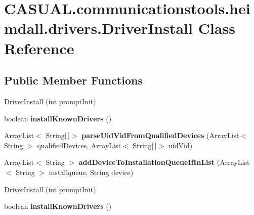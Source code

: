 \hypertarget{class_c_a_s_u_a_l_1_1communicationstools_1_1heimdall_1_1drivers_1_1_driver_install}{\section{C\-A\-S\-U\-A\-L.\-communicationstools.\-heimdall.\-drivers.\-Driver\-Install Class Reference}
\label{class_c_a_s_u_a_l_1_1communicationstools_1_1heimdall_1_1drivers_1_1_driver_install}
}
\subsection*{Public Member Functions}
\begin{DoxyCompactItemize}
\item 
\hyperlink{class_c_a_s_u_a_l_1_1communicationstools_1_1heimdall_1_1drivers_1_1_driver_install_a3973890d1a2927f6df5cc86afa09434a}{Driver\-Install} (int prompt\-Init)
\item 
\hypertarget{class_c_a_s_u_a_l_1_1communicationstools_1_1heimdall_1_1drivers_1_1_driver_install_a244d7701888d5a8b2a308f7d942bacaf}{boolean {\bfseries install\-Known\-Drivers} ()}\label{class_c_a_s_u_a_l_1_1communicationstools_1_1heimdall_1_1drivers_1_1_driver_install_a244d7701888d5a8b2a308f7d942bacaf}

\item 
\hypertarget{class_c_a_s_u_a_l_1_1communicationstools_1_1heimdall_1_1drivers_1_1_driver_install_a18f48b07185e6c00735b8475f2915804}{Array\-List$<$ String\mbox{[}$\,$\mbox{]}$>$ {\bfseries parse\-Uid\-Vid\-From\-Qualified\-Devices} (Array\-List$<$ String $>$ qualified\-Devices, Array\-List$<$ String\mbox{[}$\,$\mbox{]}$>$ uid\-Vid)}\label{class_c_a_s_u_a_l_1_1communicationstools_1_1heimdall_1_1drivers_1_1_driver_install_a18f48b07185e6c00735b8475f2915804}

\item 
\hypertarget{class_c_a_s_u_a_l_1_1communicationstools_1_1heimdall_1_1drivers_1_1_driver_install_a0e507190d24893459acf15fa40d59d65}{Array\-List$<$ String $>$ {\bfseries add\-Device\-To\-Installation\-Queue\-If\-In\-List} (Array\-List$<$ String $>$ installqueue, String device)}\label{class_c_a_s_u_a_l_1_1communicationstools_1_1heimdall_1_1drivers_1_1_driver_install_a0e507190d24893459acf15fa40d59d65}

\item 
\hyperlink{class_c_a_s_u_a_l_1_1communicationstools_1_1heimdall_1_1drivers_1_1_driver_install_a3973890d1a2927f6df5cc86afa09434a}{Driver\-Install} (int prompt\-Init)
\item 
\hypertarget{class_c_a_s_u_a_l_1_1communicationstools_1_1heimdall_1_1drivers_1_1_driver_install_a244d7701888d5a8b2a308f7d942bacaf}{boolean {\bfseries install\-Known\-Drivers} ()}\label{class_c_a_s_u_a_l_1_1communicationstools_1_1heimdall_1_1drivers_1_1_driver_install_a244d7701888d5a8b2a308f7d942bacaf}


\end{DoxyCompactItemize}

